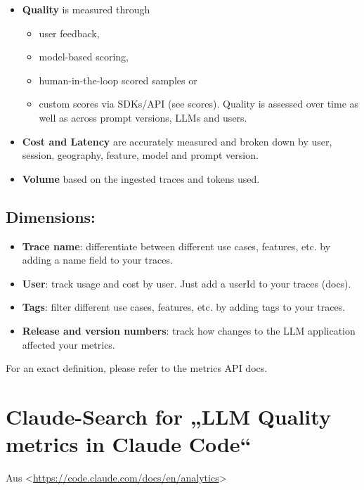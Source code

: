 \documentclass[
  letterpaper,
  DIV=11,
  numbers=noendperiod,
  oneside]{scrreprt}
\begin{document}
\begin{tcolorbox}
\begin{itemize}
\item
  \textbf{Quality} is measured through

  \begin{itemize}
  \item
    user feedback,
  \item
    model-based scoring,
  \item
    human-in-the-loop scored samples or
  \item
    custom scores via SDKs/API (see scores). Quality is assessed over
    time as well as across prompt versions, LLMs and users.
  \end{itemize}
\item
  \textbf{Cost and Latency} are accurately measured and broken down by
  user, session, geography, feature, model and prompt version.
\item
  \textbf{Volume} based on the ingested traces and tokens used.
\end{itemize}

\section{Dimensions:}\label{dimensions}

\begin{itemize}
\item
  \textbf{Trace name}: differentiate between different use cases,
  features, etc. by adding a name field to your traces.
\item
  \textbf{User}: track usage and cost by user. Just add a userId to your
  traces (docs).
\item
  \textbf{Tags}: filter different use cases, features, etc. by adding
  tags to your traces.
\item
  \textbf{Release and version numbers}: track how changes to the LLM
  application affected your metrics.
\end{itemize}

For an exact definition, please refer to the metrics API docs.

\chapter{Claude-Search for „LLM Quality metrics in Claude
Code``}\label{claude-search-for-llm-quality-metrics-in-claude-code}

Aus
\textless{}\url{https://code.claude.com/docs/en/analytics}\textgreater{}


\end{tcolorbox}
\end{document}
